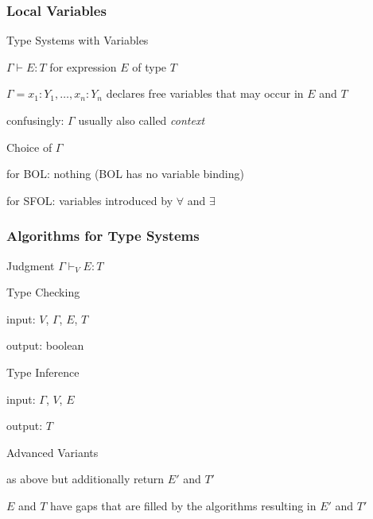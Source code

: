 \begin{frame}\frametitle{Local Variables}
\begin{blockitems}{Type Systems with Variables}
\item $\Gamma\vdash E:T$ for expression $E$ of type $T$
\item $\Gamma=x_1:Y_1,\ldots,x_n:Y_n$ declares free variables that may occur in $E$ and $T$
\item confusingly: $\Gamma$ usually also called \emph{context}
\end{blockitems}

\begin{blockitems}{Choice of $\Gamma$}
\item for BOL: nothing (BOL has no variable binding)
\item for SFOL: variables introduced by $\forall$ and $\exists$
\end{blockitems}
\end{frame}

\begin{frame}\frametitle{Algorithms for Type Systems}
Judgment $\Gamma\vdash_V E: T$
\begin{blockitems}{Type Checking}
\item input: $V$, $\Gamma$, $E$, $T$
\item output: boolean
\end{blockitems}

\begin{blockitems}{Type Inference}
\item input: $\Gamma$, $V$, $E$
\item output: $T$
\end{blockitems}


\begin{blockitems}{Advanced Variants}
\item as above but additionally return $E'$ and $T'$
\item $E$ and $T$ have gaps that are filled by the algorithms resulting in $E'$ and $T'$
\end{blockitems}
\end{frame}


